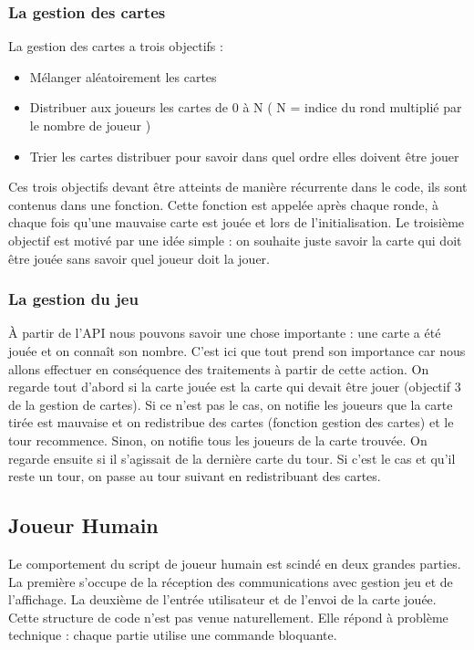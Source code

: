 \documentclass{article}
\begin{document}
\subsubsection{La gestion des cartes}

La gestion des cartes a trois objectifs :

\begin{itemize}
	\item Mélanger aléatoirement les cartes
	\item Distribuer aux joueurs les cartes de 0 à N ( N = indice du rond multiplié par le nombre de joueur )
	\item Trier les cartes distribuer pour savoir dans quel ordre elles doivent être jouer
\end{itemize}

Ces trois objectifs devant être atteints de manière récurrente dans le code, ils sont contenus dans une fonction. Cette fonction est appelée après chaque ronde, à chaque fois qu'une mauvaise carte est jouée et lors de l'initialisation. 
\newline
\newline
Le troisième objectif est motivé par une idée simple : on souhaite juste savoir la carte qui doit être jouée sans savoir quel joueur doit la jouer. 

\subsubsection{La gestion du jeu}

À partir de l'API nous pouvons savoir une chose importante : 
une carte a été jouée et on connaît son nombre. C'est ici que tout prend son importance car nous allons effectuer en conséquence des traitements à partir de cette action.\newline
On regarde tout d'abord si la carte jouée est la carte qui devait être jouer (objectif 3 de la gestion de cartes). Si ce n'est pas le cas, on notifie les joueurs que la carte tirée est mauvaise et on redistribue des cartes (fonction gestion des cartes) et le tour recommence. Sinon, on notifie tous les joueurs de la carte trouvée. On regarde ensuite si il s'agissait de la dernière carte du tour. Si c'est le cas et qu'il reste un tour, on passe au tour suivant en redistribuant des cartes. 

\subsection{Joueur Humain}
Le comportement du script de joueur humain est scindé en deux grandes parties. La première s'occupe de la réception des communications avec gestion jeu et de l'affichage. La deuxième de l'entrée utilisateur et de l'envoi de la carte jouée. Cette structure de code n'est pas venue naturellement. Elle répond à problème technique : chaque partie utilise une commande bloquante. 
\end{document}
